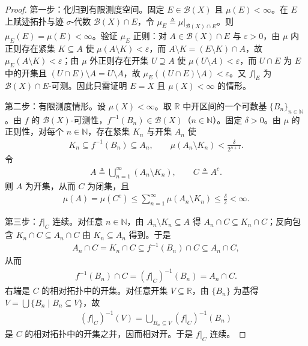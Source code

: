 \documentclass[../../main.tex]{subfiles}%
\begin{document}
\begin{proof}
第一步：化归到有限测度空间。固定 $E\in\mathscr B(X)$ 且 $\mu(E)<\infty$。在 $E$ 上赋迹拓扑与迹 $\sigma$-代数 $\mathscr B(X)\cap E$，令 $\mu_E\triangleq\mu|_{\mathscr B(X)\cap E}$。则 $\mu_E(E)=\mu(E)<\infty$。验证 $\mu_E$ 正则：对 $A\in\mathscr B(X)\cap E$ 与 $\varepsilon>0$，由 $\mu$ 内正则存在紧集 $K\subseteq A$ 使 $\mu(A\setminus K)<\varepsilon$，而 $A\setminus K=(E\setminus K)\cap A$，故 $\mu_E(A\setminus K)<\varepsilon$；由 $\mu$ 外正则存在开集 $U\supseteq A$ 使 $\mu(U\setminus A)<\varepsilon$，而 $U\cap E$ 为 $E$ 中的开集且 $(U\cap E)\setminus A=U\setminus A$，故 $\mu_E((U\cap E)\setminus A)<\varepsilon$。又 $f|_E$ 为 $\mathscr B(X)\cap E$-可测。因此只需证明 $E=X$ 且 $\mu(X)<\infty$ 的情形。

第二步：有限测度情形。设 $\mu(X)<\infty$。取 $\mathbb{R}$ 中开区间的一个可数基 $\{B_n\}_{n\in\mathbb{N}}$。由 $f$ 的 $\mathscr B(X)$-可测性，$f^{-1}(B_n)\in\mathscr B(X)$（$n\in\mathbb{N}$）。固定 $\delta>0$。由 $\mu$ 的正则性，对每个 $n\in\mathbb{N}$，存在紧集 $K_n$ 与开集 $A_n$ 使
\begin{align*}
K_n\subseteq f^{-1}(B_n)\subseteq A_n,\qquad \mu(A_n\setminus K_n)<\frac{\delta}{2^{n+1}}.
\end{align*}
令
\begin{align*}
A\triangleq\bigcup_{n=1}^\infty(A_n\setminus K_n),\qquad C\triangleq A^c.
\end{align*}
则 $A$ 为开集，从而 $C$ 为闭集，且
\begin{align*}
\mu(A)=\mu(C^c)\leqslant\sum_{n=1}^\infty\mu(A_n\setminus K_n)\leqslant\frac{\delta}{2}<\infty.
\end{align*}

第三步：$f|_C$ 连续。对任意 $n\in\mathbb{N}$，由 $A_n\setminus K_n\subseteq A$ 得 $A_n\cap C\subseteq K_n\cap C$；反向包含 $K_n\cap C\subseteq A_n\cap C$ 由 $K_n\subseteq A_n$ 得到。于是
\begin{align*}
A_n\cap C=K_n\cap C\subseteq f^{-1}(B_n)\cap C\subseteq A_n\cap C,
\end{align*}
从而
\begin{align*}
f^{-1}(B_n)\cap C=(f|_C)^{-1}(B_n)=A_n\cap C.
\end{align*}
右端是 $C$ 的相对拓扑中的开集。对任意开集 $V\subseteq\mathbb{R}$，由 $\{B_n\}$ 为基得 $V=\bigcup\{B_n\mid B_n\subseteq V\}$，故
\begin{align*}
(f|_C)^{-1}(V)=\bigcup_{B_n\subseteq V}(f|_C)^{-1}(B_n)
\end{align*}
是 $C$ 的相对拓扑中的开集之并，因而相对开。于是 $f|_C$ 连续。


\end{proof}
\end{document}
